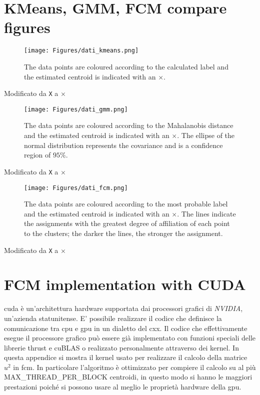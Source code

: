 \chapter{KMeans, GMM, FCM compare figures}

\begin{figure}[h]
	\centering
	\texttt{[image: Figures/dati\_kmeans.png]}
	\caption[example of \gls{kmeans} clustering]{The data points are coloured according to the calculated label and the estimated centroid is indicated with an $\times$.}
	\label{fig:data_kmeans}
\end{figure}
\begin{modified}
Modificato da \texttt{X} a $\times$
\end{modified}
\begin{figure}[h]
    \centering
    \texttt{[image: Figures/dati\_gmm.png]}
    \caption[example of \gls{gmm} clustering]{The data points are coloured according to the Mahalanobis distance and the estimated centroid is indicated with an $\times$. The ellipse of the normal distribution represents the covariance and is a confidence region of $95\%$.}
    \label{fig:data_gmm}
\end{figure}
\begin{modified}
Modificato da \texttt{X} a $\times$
\end{modified}
\begin{figure}[h]
    \centering
    \texttt{[image: Figures/dati\_fcm.png]}
    \caption[example of \gls{fcm} clustering]{The data points are coloured according to the most probable label and the estimated centroid is indicated with an $\times$. The lines indicate the assignments with the greatest degree of affiliation of each point to the clusters; the darker the lines, the stronger the assignment.}
    \label{fig:data_fcm}
\end{figure}
\begin{modified}
Modificato da \texttt{X} a $\times$
\end{modified}

\chapter{FCM implementation with CUDA} \label{appendix:fcm_kernel}
\gls{cuda} è un'architettura hardware supportata dai processori grafici di \emph{NVIDIA}, un'azienda statunitense. E' possibile realizzare il codice che definisce la comunicazione tra \gls{cpu} e \gls{gpu} in un dialetto del \gls{cxx}. Il codice che effettivamente esegue il processore grafico può essere già implementato con funzioni speciali delle librerie \gls{thrust} e \gls{cuBLAS} o realizzato personalmente attraverso dei kernel. In questa appendice si mostra il kernel usato per realizzare il calcolo della matrice $u^2$ in \gls{fcm}. In particolare l'algoritmo è ottimizzato per compiere il calcolo su al più MAX\_THREAD\_PER\_BLOCK centroidi, in questo modo si hanno le maggiori prestazioni poiché si possono usare al meglio le proprietà hardware della \gls{gpu}.

